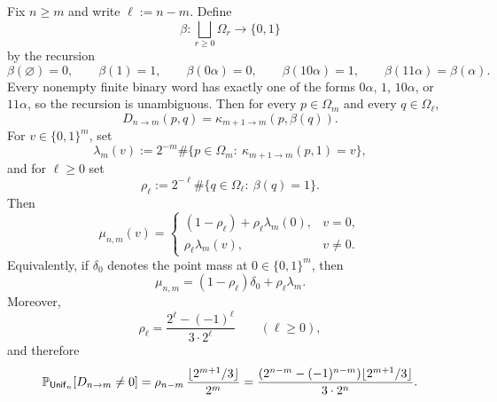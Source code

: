 \begin{theorem}
\label{thm:tail-collapse}
Fix $n\ge m$ and write $\ell:=n-m$.  Define
\[
\beta:\bigsqcup_{r\ge 0}\Omega_r\longrightarrow\{0,1\}
\]
by the recursion
\[
\beta(\varnothing)=0,
\qquad
\beta(1)=1,
\qquad
\beta(0\alpha)=0,
\qquad
\beta(10\alpha)=1,
\qquad
\beta(11\alpha)=\beta(\alpha).
\]
Every nonempty finite binary word has exactly one of the forms $0\alpha$,
$1$, $10\alpha$, or $11\alpha$, so the recursion is unambiguous.
Then for every $p\in\Omega_m$ and every $q\in\Omega_\ell$,
\[
D_{n\to m}(p,q)=\kappa_{m+1\to m}(p,\beta(q)).
\]
For $v\in\{0,1\}^m$, set
\[
\lambda_m(v):=2^{-m}\#\{p\in\Omega_m:\ \kappa_{m+1\to m}(p,1)=v\},
\]
and for $\ell\ge 0$ set
\[
\rho_\ell:=2^{-\ell}\#\{q\in\Omega_\ell:\ \beta(q)=1\}.
\]
Then
\[
\mu_{n,m}(v)=
\begin{cases}
(1-\rho_\ell)+\rho_\ell\lambda_m(0),& v=0,\\[4pt]
\rho_\ell\lambda_m(v),& v\ne 0.
\end{cases}
\]
Equivalently, if $\delta_0$ denotes the point mass at $0\in\{0,1\}^m$, then
\[
\mu_{n,m}=(1-\rho_\ell)\delta_0+\rho_\ell\lambda_m.
\]
Moreover,
\[
\rho_\ell=\frac{2^\ell-(-1)^\ell}{3\cdot 2^\ell}
\qquad (\ell\ge 0),
\]
and therefore
\[
\mathbb{P}_{\mathsf{Unif}_n}[D_{n\to m}\ne 0]
=
\rho_{n-m}\,\frac{\lfloor 2^{m+1}/3\rfloor}{2^m}
=
\frac{(2^{n-m}-(-1)^{n-m})\lfloor 2^{m+1}/3\rfloor}{3\cdot 2^n}.
\]
\end{theorem}

